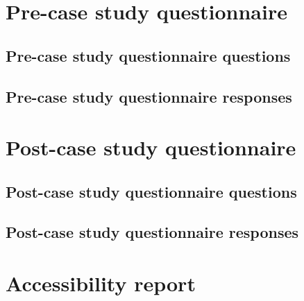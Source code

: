 \documentclass{master_thesis}
\begin{document}
\appendix
\section{Pre-case study questionnaire }\label{appendix:pre-survey}
\subsection{Pre-case study questionnaire questions}\label{appendix:pre-survey-questions}
\subsection{Pre-case study questionnaire responses}\label{appendix:pre-survey-responses}
\section{Post-case study questionnaire }\label{appendix:post-survey}
\subsection{Post-case study questionnaire questions}\label{appendix:post-survey-questions}
\subsection{Post-case study questionnaire responses}\label{appendix:post-survey-responses}
\section{Accessibility report}\label{appendix:report}

\end{document}
